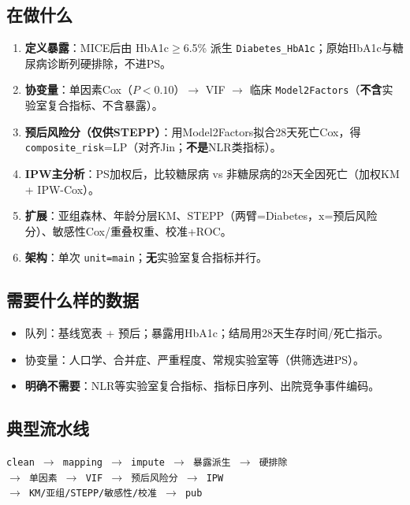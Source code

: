 \documentclass[11pt,a4paper]{article}
\begin{document}
\subsection{在做什么}
\begin{enumerate}
  \item \textbf{定义暴露}：MICE后由 HbA1c$\geq$6.5\% 派生 \texttt{Diabetes\_HbA1c}；原始HbA1c与糖尿病诊断列硬排除，不进PS。
  \item \textbf{协变量}：单因素Cox（$P<0.10$）$\rightarrow$ VIF $\rightarrow$ 临床 \texttt{Model2Factors}（\textbf{不含}实验室复合指标、不含暴露）。
  \item \textbf{预后风险分（仅供STEPP）}：用Model2Factors拟合28天死亡Cox，得 \texttt{composite\_risk}=LP（对齐Jin；\textbf{不是}NLR类指标）。
  \item \textbf{IPW主分析}：PS加权后，比较糖尿病 vs 非糖尿病的28天全因死亡（加权KM + IPW-Cox）。
  \item \textbf{扩展}：亚组森林、年龄分层KM、STEPP（两臂=Diabetes，$\mathrm{x}$=预后风险分）、敏感性Cox/重叠权重、校准+ROC。
  \item \textbf{架构}：单次 \texttt{unit=main}；\textbf{无}实验室复合指标并行。
\end{enumerate}

\subsection{需要什么样的数据}
\begin{itemize}
  \item 队列：基线宽表 + 预后；暴露用HbA1c；结局用28天生存时间/死亡指示。
  \item 协变量：人口学、合并症、严重程度、常规实验室等（供筛选进PS）。
  \item \textbf{明确不需要}：NLR等实验室复合指标、指标日序列、出院竞争事件编码。
\end{itemize}

\subsection{典型流水线}
\begin{center}
\small
\texttt{clean $\rightarrow$ mapping $\rightarrow$ impute $\rightarrow$ 暴露派生 $\rightarrow$ 硬排除}\\
\texttt{$\rightarrow$ 单因素 $\rightarrow$ VIF $\rightarrow$ 预后风险分 $\rightarrow$ IPW}\\
\texttt{$\rightarrow$ KM/亚组/STEPP/敏感性/校准 $\rightarrow$ pub}
\end{center}
\end{document}
